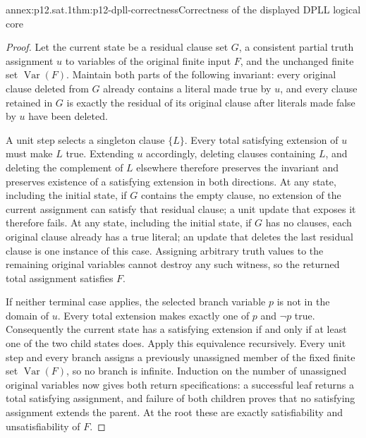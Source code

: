
\begin{annexitem}{annex:p12.sat.1}{thm:p12-dpll-correctness}{Correctness of the displayed DPLL logical core}
\begin{proof}
Let the current state be a residual clause set \(G\), a consistent partial
truth assignment \(u\) to variables of the original finite input \(F\), and
the unchanged finite set \(\operatorname{Var}(F)\).  Maintain both parts of the
following invariant: every original clause deleted from \(G\) already contains
a literal made true by \(u\), and every clause retained in \(G\) is exactly the
residual of its original clause after literals made false by \(u\) have been
deleted.

A unit step selects a singleton clause \(\{L\}\).  Every total satisfying
extension of \(u\) must make \(L\) true.  Extending \(u\) accordingly, deleting
clauses containing \(L\), and deleting the complement of \(L\) elsewhere
therefore preserves the invariant and preserves existence of a satisfying
extension in both directions.  At any state, including the initial state, if
\(G\) contains the empty clause, no extension of the current assignment can
satisfy that residual clause; a unit update that exposes it therefore fails.
At any state, including the initial state, if \(G\) has no clauses, each
original clause already has a true literal; an update that deletes the last
residual clause is one instance of this case.  Assigning
arbitrary truth values to the remaining original variables cannot
destroy any such witness, so the returned total assignment satisfies \(F\).

If neither terminal case applies, the selected branch variable \(p\) is not in
the domain of \(u\).  Every total extension makes exactly one of \(p\) and
\(\neg p\) true.  Consequently the current state has a satisfying extension if
and only if at least one of the two child states does.  Apply this equivalence
recursively.  Every unit step and every branch assigns a previously unassigned
member of the fixed finite set \(\operatorname{Var}(F)\), so no branch is
infinite.  Induction on the number of unassigned original variables now gives
both return specifications: a successful leaf returns a total satisfying
assignment, and failure of both children proves that no satisfying assignment
extends the parent.  At the root these are exactly satisfiability and
unsatisfiability of \(F\).
\end{proof}
\end{annexitem}
